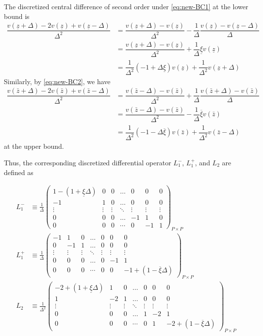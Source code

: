 \documentclass[11pt]{article}
\begin{document}
The discretized central difference of second order under \eqref{eq:new-BC1} at the lower bound is
\begin{align}
\dfrac{v (\underline{z} + \Delta) - 2 v(\underline{z}) + v(\underline{z}-\Delta)}{\Delta^2} &=   \dfrac{v(\underline{z} + \Delta) - v(\underline{z})}{\Delta^2} - \dfrac{1}{\Delta}\dfrac{v (\underline{z}) - v(\underline{z}-\Delta) }{\Delta}  \\
&= \dfrac{v(\underline{z} + \Delta) - v(\underline{z})}{\Delta^2} + \dfrac{1}{\Delta} \underline{\xi} v(\underline{z})  \\ 
&= \dfrac{1}{\Delta^2}  (- 1 + \Delta \underline{\xi}) v(\underline{z})  + \dfrac{1}{\Delta^2}  v(\underline{z} + \Delta)  
\end{align}
Similarly, by \eqref{eq:new-BC2}, we have
\begin{align}
\dfrac{v (\bar{z} + \Delta) - 2 v(\bar{z} ) + v(\bar{z} -\Delta)}{\Delta^2} &=   \dfrac{v(\bar{z} - \Delta) - v(\bar{z})}{\Delta^2} + \dfrac{1}{\Delta}\dfrac{ v(\bar{z}+\Delta) - v (\bar{z}) }{\Delta}  \\
&= \dfrac{v(\bar{z} - \Delta) - v(\bar{z})}{\Delta^2}  - \dfrac{1}{\Delta} \overline{\xi} v(\bar{z})  \\ 
&= \dfrac{1}{\Delta^2}  (- 1 - \Delta \overline{\xi}) v(\bar{z})  + \dfrac{1}{\Delta^2}  v(\bar{z} - \Delta)  
\end{align}
at the upper bound.

Thus, the corresponding discretized differential operator $L_1^{-}$, $L_1^{+}$, and $L_2$ are defined as 

\begin{align}
L_1^{-} &\equiv \frac{1}{\Delta}\begin{pmatrix}
1 - (1 + \underline{\xi} \Delta) &0&0&\dots&0&0&0\\
-1&1&0&\dots&0&0&0\\
\vdots&\vdots&\vdots&\ddots&\vdots&\vdots&\vdots\\
0&0&0&\dots&-1&1&0\\
0&0&0&\cdots&0&-1&1
\end{pmatrix}_{P\times P}\label{eq:L-1-regular} \\
L_1^{+} &\equiv \frac{1}{\Delta}\begin{pmatrix}
-1&1&0&\dots&0&0&0\\
0&-1&1&\dots&0&0&0\\
\vdots&\vdots&\vdots&\ddots&\vdots&\vdots&\vdots\\
0&0&0&\dots&0&-1&1\\
0&0&0&\cdots&0&0&-1+(1-\overline{\xi} \Delta)
\end{pmatrix}_{P\times P}\label{eq:L-1-plus-regular} \\
L_2 &\equiv \frac{1}{\Delta^2}\begin{pmatrix}
-2 + (1 + \underline{\xi}\Delta) &1&0&\dots&0&0&0\\
1&-2&1&\dots&0&0&0\\
\vdots&\vdots&\vdots&\ddots&\vdots&\vdots&\vdots\\
0&0&0&\dots&1&-2&1\\
0&0&0&\cdots&0&1&-2 + (1- \overline{\xi}\Delta)
\end{pmatrix}_{P\times P}\label{eq:L-2-regular}
\end{align}
\end{document}
